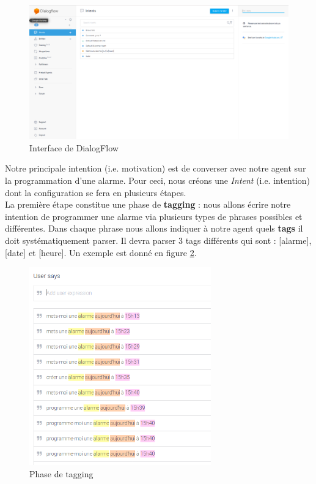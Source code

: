 \begin{figure}[H]
    \centering
        \centering
        \includegraphics[width=1\textwidth]{images/dialogflow.png}
        \caption{Interface de DialogFlow}
        \label{intents}
\end{figure}

Notre principale intention (i.e. motivation) est de converser avec notre agent sur la programmation d'une alarme. Pour ceci, nous créons une \emph{Intent} (i.e. intention) dont
la configuration se fera en plusieurs étapes.\\

La première étape constitue une phase de \textbf{tagging} : nous allons écrire notre intention de programmer une alarme via plusieurs types de phrases possibles et différentes.
Dans chaque phrase nous allons indiquer à notre agent quels \textbf{tags} il doit systématiquement parser. Il devra parser 3 tags différents qui sont : [alarme], [date] et
[heure]. Un exemple est donné en figure \ref{tagging}.

\begin{figure}[H]
    \centering
        \centering
        \includegraphics[width=0.7\textwidth]{images/intents.png}
        \caption{Phase de tagging}
        \label{tagging}
\end{figure}

